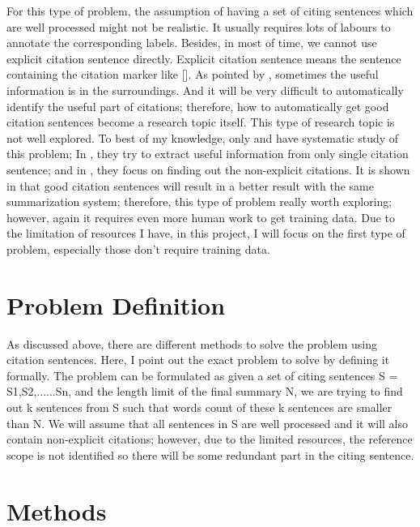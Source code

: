 \documentclass[hyp]{socreport}
\begin{document}
For this type of problem, the assumption of having a set of citing sentences which are well processed might not be realistic. It usually requires lots of labours to annotate the corresponding labels. Besides, in most of time, we cannot use explicit citation sentence directly. Explicit citation sentence means the sentence containing the citation marker like {} []. As pointed by \citep{qazvinian2010}, sometimes the useful information is in the surroundings. And it will be very difficult to automatically identify the useful part of citations; therefore, how to automatically get good citation sentences become a research topic itself. This type of research topic is not well explored. To best of my knowledge, only \citep{abujbara2012} and \citep{qazvinianradev:2010} have systematic study of this problem; In \citep{abujbara2012}, they try to extract useful information from only single citation sentence; and in \citep{qazvinianradev:2010}, they focus on finding out the non-explicit citations. It is shown in \citep{abujbara2012} that good citation sentences will result in a better result with the same summarization system; therefore, this type of problem really worth exploring; however, again it requires even more human work to get training data. Due to the limitation of resources I have, in this project, I will focus on the first type of problem, especially those don't require training data.




\section{Problem Definition}

As discussed above, there are different methods to solve the problem using citation sentences. Here, I point out the exact problem to solve by defining it formally. The problem can be formulated as given a set of citing sentences S = {S1,S2,......Sn}, and the length limit of the final summary N, we are trying to find out k sentences from S such that words count of these k sentences are smaller than N. We will assume that all sentences in S are well processed and it will also contain non-explicit citations; however, due to the limited resources, the reference scope is not identified so there will be some redundant part in the citing sentence.

\section{Methods}
\end{document}
